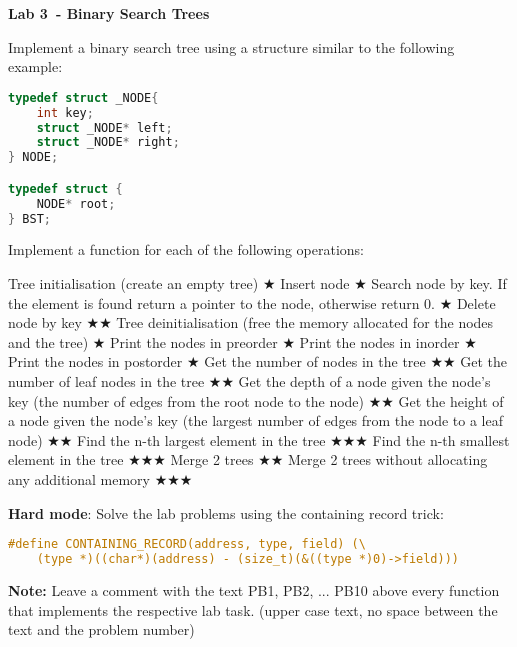 \documentclass{exam}
\newcommand\labnr{3}
\newcommand\lab{Lab \labnr\ - Binary Search Trees}
\newcommand\lvlez{$\bigstar$}
\newcommand\lvlmed{\lvlez\lvlez}
\newcommand\lvlhard{\lvlmed\lvlez}
\begin{document}
\begin{center}
    \vspace*{0cm}
    \bfseries\LARGE
    \lab
    \vspace*{1cm}
\end{center}

\noindent Implement a binary search tree using a structure similar to the following example:

\begin{lstlisting}[language=C]
typedef struct _NODE{
    int key;
    struct _NODE* left;
    struct _NODE* right;
} NODE;

typedef struct {
    NODE* root;
} BST;
\end{lstlisting}


\bigskip
\noindent Implement a function for each of the following operations:

\begin{questions}
\question Tree initialisation (create an empty tree) \lvlez
\question Insert node \lvlez
\question Search node by key. If the element is found return a pointer to the node, otherwise return 0. \lvlez
\question Delete node by key \lvlmed
\question Tree deinitialisation (free the memory allocated for the nodes and the tree) \lvlez
\question Print the nodes in preorder \lvlez
\question Print the nodes in inorder \lvlez
\question Print the nodes in postorder \lvlez
\question Get the number of nodes in the tree \lvlmed
\question Get the number of leaf nodes in the tree \lvlmed
\question Get the depth of a node given the node's key (the number of edges from the root node to the node) \lvlmed
\question Get the height of a node given the node's key (the largest number of edges from the node to a leaf node) \lvlmed
\question Find the n-th largest element in the tree \lvlhard
\question Find the n-th smallest element in the tree \lvlhard
\question Merge 2 trees \lvlmed
\question Merge 2 trees without allocating any additional memory \lvlhard
\end{questions}

\bigskip
\noindent\textbf{Hard mode}: Solve the lab problems using the containing record trick:
\begin{lstlisting}[language=C]
#define CONTAINING_RECORD(address, type, field) (\
    (type *)((char*)(address) - (size_t)(&((type *)0)->field)))
\end{lstlisting}
\textbf{Note:} Leave a comment with the text PB1, PB2, ... PB10 above every function that implements the respective lab task. (upper case text, no space between the text and the problem number)

\medskip
\printbibliography
\end{document}
